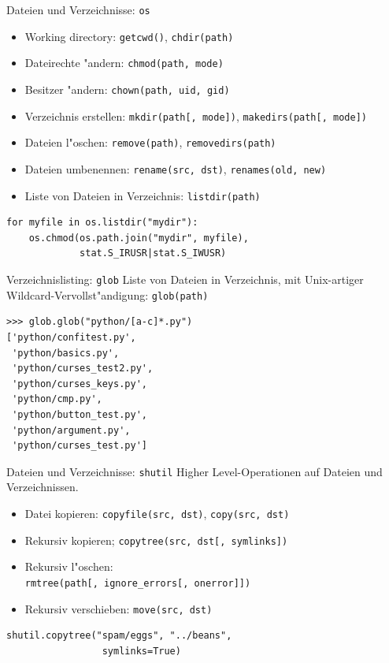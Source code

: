 \begin{frame}[fragile]{Dateien und Verzeichnisse: \texttt{os}}
\begin{itemize}
\item Working directory: \lstinline{getcwd()}, \lstinline{chdir(path)}
\item Dateirechte "andern: \lstinline{chmod(path, mode)}
\item Besitzer "andern: \lstinline{chown(path, uid, gid)}
\item Verzeichnis erstellen: \lstinline{mkdir(path[, mode])}, \lstinline{makedirs(path[, mode])}
\item Dateien l"oschen: \lstinline{remove(path)}, \lstinline{removedirs(path)}
\item Dateien umbenennen: \lstinline{rename(src, dst)}, \lstinline{renames(old, new)}
\item Liste von Dateien in Verzeichnis: \lstinline{listdir(path)}
\end{itemize}
\begin{lstlisting}[style=Python]
for myfile in os.listdir("mydir"):
    os.chmod(os.path.join("mydir", myfile), 
             stat.S_IRUSR|stat.S_IWUSR)
\end{lstlisting}
\end{frame} 

\begin{frame}[fragile]{Verzeichnislisting: \texttt{glob}}
Liste von Dateien in Verzeichnis, mit Unix-artiger Wildcard-Vervollst"andigung: \texttt{glob(path)}
\begin{lstlisting}[style=Shell]
>>> glob.glob("python/[a-c]*.py")
['python/confitest.py',
 'python/basics.py',
 'python/curses_test2.py',
 'python/curses_keys.py',
 'python/cmp.py',
 'python/button_test.py',
 'python/argument.py',
 'python/curses_test.py']
\end{lstlisting}
\end{frame}

\begin{frame}[fragile]{Dateien und Verzeichnisse: \texttt{shutil}}
Higher Level-Operationen auf Dateien und Verzeichnissen.
\begin{itemize}
\item Datei kopieren: \texttt{copyfile(src, dst)}, \texttt{copy(src, dst)}
\item Rekursiv kopieren; \texttt{copytree(src, dst[, symlinks])}
\item Rekursiv l"oschen: \\\texttt{rmtree(path[, ignore\_errors[, onerror]])}
\item Rekursiv verschieben: \texttt{move(src, dst)}
\end{itemize}
\begin{lstlisting}[style=Python]
shutil.copytree("spam/eggs", "../beans", 
                 symlinks=True)
\end{lstlisting}
\end{frame}

